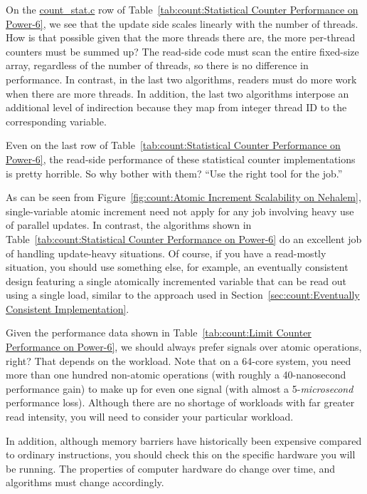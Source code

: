 \QuickQ{}
	On the \url{count_stat.c} row of
	Table~\ref{tab:count:Statistical Counter Performance on Power-6},
	we see that the update side scales linearly with the number of
	threads.
	How is that possible given that the more threads there are,
	the more per-thread counters must be summed up?
\QuickA{}
	The read-side code must scan the entire fixed-size array, regardless
	of the number of threads, so there is no difference in performance.
	In contrast, in the last two algorithms, readers must do more
	work when there are more threads.
	In addition, the last two algorithms interpose an additional
	level of indirection because they map from integer thread ID
	to the corresponding  variable.

\QuickQ{}
	Even on the last row of
	Table~\ref{tab:count:Statistical Counter Performance on Power-6},
	the read-side performance of these statistical counter
	implementations is pretty horrible.
	So why bother with them?
\QuickA{}
	``Use the right tool for the job.''

	As can be seen from
	Figure~\ref{fig:count:Atomic Increment Scalability on Nehalem},
	single-variable atomic increment need not apply for any job
	involving heavy use of parallel updates.
	In contrast, the algorithms shown in
	Table~\ref{tab:count:Statistical Counter Performance on Power-6}
	do an excellent job of handling update-heavy situations.
	Of course, if you have a read-mostly situation, you should
	use something else, for example, an eventually consistent design
	featuring a single atomically incremented
	variable that can be read out using a single load,
	similar to the approach used in
	Section~\ref{sec:count:Eventually Consistent Implementation}.

\QuickQ{}
	Given the performance data shown in
	Table~\ref{tab:count:Limit Counter Performance on Power-6},
	we should always prefer signals over atomic operations, right?
\QuickA{}
	That depends on the workload.
	Note that on a 64-core system, you need more than
	one hundred non-atomic operations (with roughly
	a 40-nanosecond performance gain) to make up for even one
	signal (with almost a 5-\emph{microsecond} performance loss).
	Although there are no shortage of workloads with far greater
	read intensity, you will need to consider your particular
	workload.

	In addition, although memory barriers have historically been
	expensive compared to ordinary instructions, you should
	check this on the specific hardware you will be running.
	The properties of computer hardware do change over time,
	and algorithms must change accordingly.

